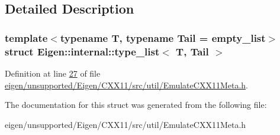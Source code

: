 \subsection{Detailed Description}
\subsubsection*{template$<$typename T, typename Tail = empty\+\_\+list$>$\newline
struct Eigen\+::internal\+::type\+\_\+list$<$ T, Tail $>$}



Definition at line \hyperlink{eigen_2unsupported_2_eigen_2_c_x_x11_2src_2util_2_emulate_c_x_x11_meta_8h_source_l00027}{27} of file \hyperlink{eigen_2unsupported_2_eigen_2_c_x_x11_2src_2util_2_emulate_c_x_x11_meta_8h_source}{eigen/unsupported/\+Eigen/\+C\+X\+X11/src/util/\+Emulate\+C\+X\+X11\+Meta.\+h}.



The documentation for this struct was generated from the following file\+:\begin{DoxyCompactItemize}
\item 
eigen/unsupported/\+Eigen/\+C\+X\+X11/src/util/\+Emulate\+C\+X\+X11\+Meta.\+h\end{DoxyCompactItemize}
